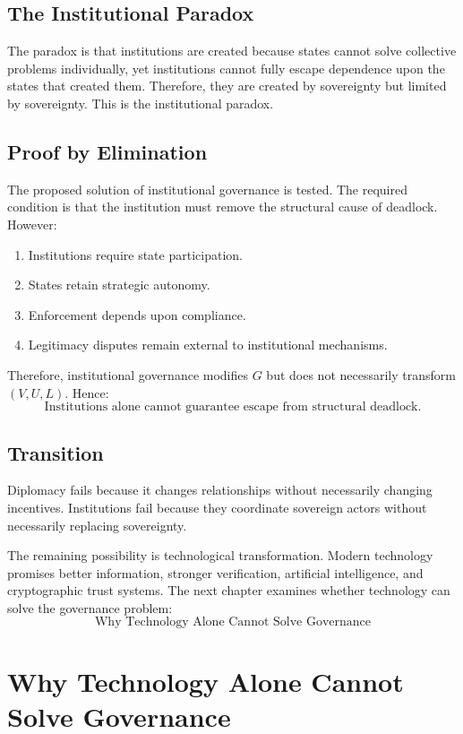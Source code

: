 \documentclass[11pt,openany]{book}
\theoremstyle{plain}
\theoremstyle{definition}
\begin{document}
\section*{The Institutional Paradox}

The paradox is that institutions are created because states cannot solve collective problems individually, yet institutions cannot fully escape dependence upon the states that created them. Therefore, they are created by sovereignty but limited by sovereignty. This is the institutional paradox.

\section*{Proof by Elimination}

The proposed solution of institutional governance is tested. The required condition is that the institution must remove the structural cause of deadlock. However:
\begin{enumerate}
\item Institutions require state participation.
\item States retain strategic autonomy.
\item Enforcement depends upon compliance.
\item Legitimacy disputes remain external to institutional mechanisms.
\end{enumerate}

Therefore, institutional governance modifies \(G\) but does not necessarily transform \((V, U, L)\). Hence:
\[
\boxed{
\text{Institutions alone cannot guarantee escape from structural deadlock.}
}
\]

\section*{Transition}

Diplomacy fails because it changes relationships without necessarily changing incentives. Institutions fail because they coordinate sovereign actors without necessarily replacing sovereignty. 

The remaining possibility is technological transformation. Modern technology promises better information, stronger verification, artificial intelligence, and cryptographic trust systems. The next chapter examines whether technology can solve the governance problem:
\[
\boxed{
\text{Why Technology Alone Cannot Solve Governance}
}
\]

\chapter{Why Technology Alone Cannot Solve Governance}
\end{document}

